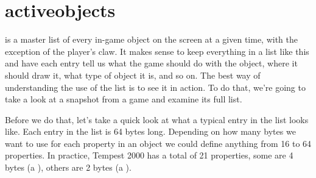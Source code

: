 \chapter{activeobjects}
\label{sec:activeobjects}
\lstset{style=68KStyle}
\lhead[tempest 2000]{}

 is a master list of every in-game object on the screen at a given time, with the
exception of the player's claw. It makes sense to keep everything in a list like this and have each
entry tell us what the game should do with the object, where it should draw it, what type of object
it is, and so on. The best way of understanding the use of the  list is to see it
in action. To do that, we're going to take a look at a snapshot from a game and examine its full 
 list.

Before we do that, let's take a quick look at what a typical entry in the  list 
looks like. Each entry in the  list is 64 bytes long. Depending on how many bytes we
want to use for each property in an object we could define anything from 16
to 64 properties. In practice, Tempest 2000 has a total of 21 properties, some are 4 bytes (a ),
others are 2 bytes (a ).

